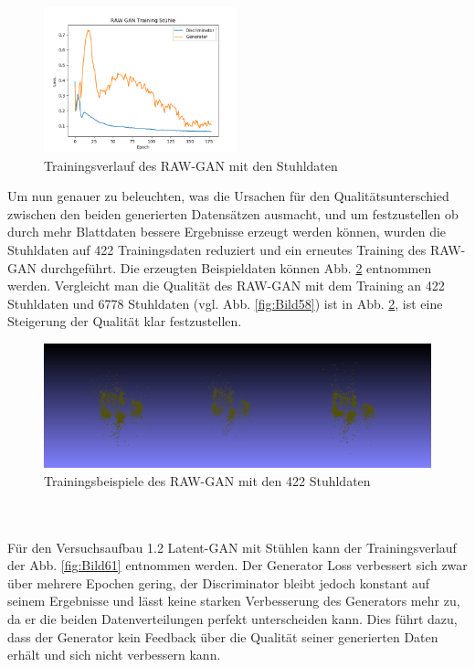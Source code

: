 \documentclass{llncs}
\begin{document}
\begin{figure}[htbp] 
	\centering
	\includegraphics[width=0.5\textwidth]{raw_gan_chair_result.png}
	\caption{Trainingsverlauf des RAW-GAN mit den Stuhldaten}
	\label{fig:Bild57}
\end{figure}
\pagebreak\linebreak 
Um nun genauer zu beleuchten, was die Ursachen für den Qualitätsunterschied zwischen den beiden generierten Datensätzen ausmacht, und um festzustellen ob durch mehr Blattdaten bessere Ergebnisse erzeugt werden können, wurden die Stuhldaten auf 422 Trainingsdaten reduziert und ein erneutes Training des RAW-GAN durchgeführt. Die erzeugten Beispieldaten können Abb. \ref{fig:Bild60} entnommen werden. Vergleicht man die Qualität des RAW-GAN mit dem Training an 422 Stuhldaten und 
6778 Stuhldaten (vgl. Abb. \ref{fig:Bild58}) ist in Abb. \ref{fig:Bild60}, ist eine Steigerung der Qualität klar festzustellen. 
\begin{figure}[htbp] 
	\centering
	\includegraphics[width=1.0\textwidth]{raw_gan_result_400_result.png}
	\caption{Trainingsbeispiele des RAW-GAN mit den 422 Stuhldaten}
	\label{fig:Bild60}
\end{figure}
~\\\\
Für den Versuchsaufbau 1.2 Latent-GAN mit Stühlen kann der Trainingsverlauf der Abb. \ref{fig:Bild61} entnommen werden. Der Generator Loss verbessert sich zwar über mehrere Epochen gering, der Discriminator bleibt jedoch konstant auf seinem Ergebnisse und lässt keine starken Verbesserung des Generators mehr zu, da er die beiden Datenverteilungen perfekt unterscheiden kann. Dies führt dazu, dass der Generator kein Feedback über die Qualität seiner generierten Daten erhält und sich nicht verbessern kann.  
\end{document}
